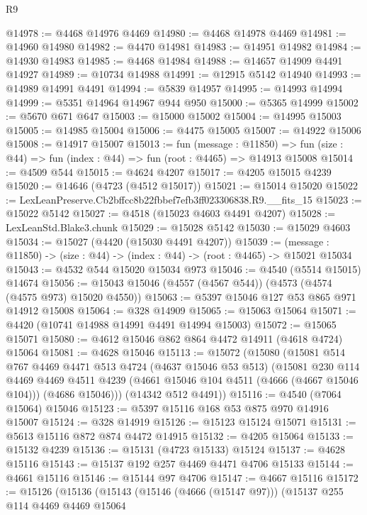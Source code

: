 \begin{lexlean}{R9}
\begin{coremodule}
@14978 := @4468 @14976 @4469
@14980 := @4468 @14978 @4469
@14981 := @14960 @14980
@14982 := @4470 @14981
@14983 := @14951 @14982
@14984 := @14930 @14983
@14985 := @4468 @14984
@14988 := @14657 @14909 @4491 @14927
@14989 := @10734 @14988
@14991 := @12915 @5142 @14940
@14993 := @14989 @14991 @4491
@14994 := @5839 @14957
@14995 := @14993 @14994
@14999 := @5351 @14964 @14967 @944 @950
@15000 := @5365 @14999
@15002 := @5670 @671 @647
@15003 := @15000 @15002
@15004 := @14995 @15003
@15005 := @14985 @15004
@15006 := @4475 @15005
@15007 := @14922 @15006
@15008 := @14917 @15007
@15013 := fun (message : @11850) =>
  fun (size : @44) => fun (index : @44) => fun (root : @4465) => @14913 @15008
@15014 := @4509 @544
@15015 := @4624 @4207
@15017 := @4205 @15015 @4239
@15020 := @14646 (@4723 (@4512 @15017))
@15021 := @15014 @15020
@15022 := LexLeanPreserve.Cb2bffcc8b22fbbef7efb3ff023306838.R9.__fits_15
@15023 := @15022 @5142
@15027 := @4518 (@15023 @4603 @4491 @4207)
@15028 := LexLeanStd.Blake3.chunk
@15029 := @15028 @5142
@15030 := @15029 @4603
@15034 := @15027 (@4420 (@15030 @4491 @4207))
@15039 := (message : @11850) -> (size : @44) -> (index : @44) -> (root : @4465) -> @15021 @15034
@15043 := @4532 @544 @15020 @15034 @973
@15046 := @4540 (@5514 @15015) @14674
@15056 := @15043 @15046 (@4557 (@4567 @544)) (@4573 (@4574 (@4575 @973) @15020 @4550))
@15063 := @5397 @15046 @127 @53 @865 @971 @14912 @15008
@15064 := @328 @14909
@15065 := @15063 @15064
@15071 := @4420 (@10741 @14988 @14991 @4491 @14994 @15003)
@15072 := @15065 @15071
@15080 := @4612 @15046 @862 @864 @4472 @14911 (@4618 @4724) @15064
@15081 := @4628 @15046
@15113 := @15072
    (@15080
      (@15081
        @514
        @767
        @4469
        @4471
        @513
        @4724
        (@4637 @15046 @53 @513)
        (@15081
          @230
          @114
          @4469
          @4469
          @4511
          @4239
          (@4661 @15046 @104 @4511 (@4666 (@4667 @15046 @104)))
          (@4686 @15046)))
      (@14342 @512 @4491))
@15116 := @4540 (@7064 @15064) @15046
@15123 := @5397 @15116 @168 @53 @875 @970 @14916 @15007
@15124 := @328 @14919
@15126 := @15123 @15124 @15071
@15131 := @5613 @15116 @872 @874 @4472 @14915
@15132 := @4205 @15064
@15133 := @15132 @4239
@15136 := @15131 (@4723 @15133) @15124
@15137 := @4628 @15116
@15143 := @15137 @192 @257 @4469 @4471 @4706 @15133
@15144 := @4661 @15116
@15146 := @15144 @97 @4706
@15147 := @4667 @15116
@15172 := @15126
    (@15136
      (@15143
        (@15146 (@4666 (@15147 @97)))
        (@15137
          @255
          @114
          @4469
          @4469
          @15064

\end{coremodule}
\end{lexlean}
